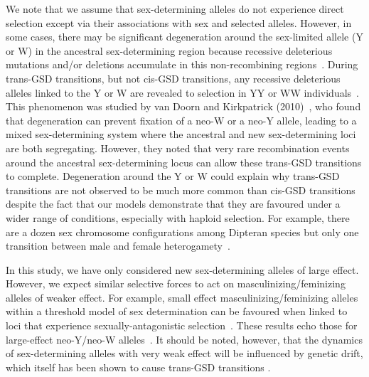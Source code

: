 \documentclass[10pt,letterpaper]{article}
\begin{document}
We note that we assume that sex-determining alleles do not experience direct selection except via their associations with sex and selected alleles.
However, in some cases, there may be significant degeneration around the sex-limited allele (Y or W) in the ancestral sex-determining region because recessive deleterious mutations and/or deletions accumulate in this non-recombining regions~\cite{Rice:1996ke,Charlesworth:2000cc,Bachtrog:2006ed,Marais:2008hm}. 
During trans-GSD transitions, but not cis-GSD transitions, any recessive deleterious alleles linked to the Y or W are revealed to selection in YY or WW individuals~\cite{Bachtrog:2014bx}. 
This phenomenon was studied by van Doorn and Kirkpatrick (2010)~\cite{vanDoorn:2010hu}, who found that degeneration can prevent fixation of a neo-W or a neo-Y allele, leading to a mixed sex-determining system where the ancestral and new sex-determining loci are both segregating. 
However, they noted that very rare recombination events around the ancestral sex-determining locus can allow these trans-GSD transitions to complete.  
Degeneration around the Y or W could explain why trans-GSD transitions are not observed to be much more common than cis-GSD transitions despite the fact that our models demonstrate that they are favoured under a wider range of conditions, especially with haploid selection. 
For example, there are a dozen sex chromosome configurations among Dipteran species but only one transition between male and female heterogamety~\cite{Vicoso:2015hf}. 

In this study, we have only considered new sex-determining alleles of large effect. 
However, we expect similar selective forces to act on masculinizing/feminizing alleles of weaker effect.
For example, small effect masculinizing/feminizing alleles within a threshold model of sex determination can be favoured when linked to loci that experience sexually-antagonistic selection~\cite{Muralidhar2018}. 
These results echo those for large-effect neo-Y/neo-W alleles~\cite{vanDoorn:2007eu,vanDoorn:2010hu}.
It should be noted, however, that the dynamics of sex-determining alleles with very weak effect will be influenced by genetic drift, which itself has been shown to cause trans-GSD transitions \cite{Veller2017}.
\end{document}
